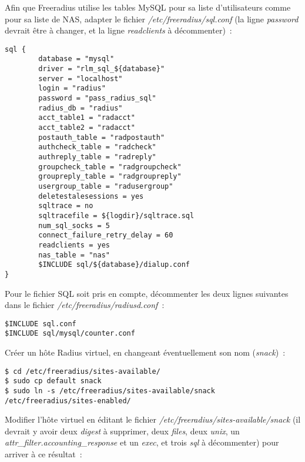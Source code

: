 Afin que Freeradius utilise les tables MySQL pour sa liste d'utilisateurs comme pour sa liste de NAS, adapter le fichier \emph{/etc/freeradius/sql.conf} (la ligne \emph{password} devrait être à changer, et la ligne \emph{readclients} à décommenter)~:
\begin{lstlisting}
sql {
        database = "mysql"
        driver = "rlm_sql_${database}"
        server = "localhost"
        login = "radius"
        password = "pass_radius_sql"
        radius_db = "radius"
        acct_table1 = "radacct"
        acct_table2 = "radacct"
        postauth_table = "radpostauth"
        authcheck_table = "radcheck"
        authreply_table = "radreply"
        groupcheck_table = "radgroupcheck"
        groupreply_table = "radgroupreply"
        usergroup_table = "radusergroup"
        deletestalesessions = yes
        sqltrace = no
        sqltracefile = ${logdir}/sqltrace.sql
        num_sql_socks = 5
        connect_failure_retry_delay = 60
        readclients = yes
        nas_table = "nas"
        $INCLUDE sql/${database}/dialup.conf
}
\end{lstlisting}

Pour le fichier SQL soit pris en compte, décommenter les deux lignes suivantes dans le fichier \emph{/etc/freeradius/radiusd.conf}~:

\begin{lstlisting}
$INCLUDE sql.conf
$INCLUDE sql/mysql/counter.conf
\end{lstlisting}

Créer un hôte Radius virtuel, en changeant éventuellement son nom (\emph{snack})~:

\begin{lstlisting}
$ cd /etc/freeradius/sites-available/
$ sudo cp default snack
$ sudo ln -s /etc/freeradius/sites-available/snack /etc/freeradius/sites-enabled/
\end{lstlisting}

Modifier l'hôte virtuel en éditant le fichier \emph{/etc/freeradius/sites-available/snack} (il devrait y avoir deux \emph{digest} à supprimer, deux \emph{files}, deux \emph{unix}, un \emph{attr\_filter.accounting\_response} et un \emph{exec}, et trois \emph{sql} à décommenter) pour arriver à ce résultat~:

